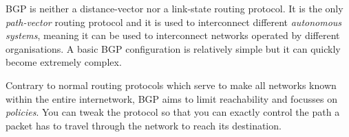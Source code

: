 BGP is neither a distance-vector nor a link-state routing protocol.
It is the only \emph{path-vector} routing protocol and it is used to interconnect different \emph{autonomous systems}, meaning it can be used to interconnect networks operated by different organisations.
A basic BGP configuration is relatively simple but it can quickly become extremely complex.

Contrary to normal routing protocols which serve to make all networks known within the entire internetwork, BGP aims to limit reachability and focusses on \emph{policies}.
You can tweak the protocol so that you can exactly control the path a packet has to travel through the network to reach its destination.
